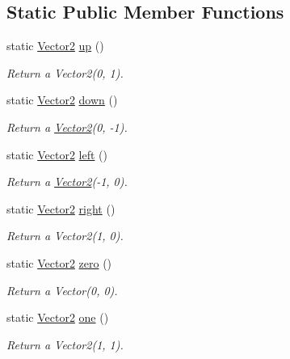\subsection*{Static Public Member Functions}
\begin{DoxyCompactItemize}
\item 
static \hyperlink{classfuzzy_telegram_1_1_vector2}{Vector2} \hyperlink{classfuzzy_telegram_1_1_vector2_aadd7753892849f0b2c153c5722994e09}{up} ()
\begin{DoxyCompactList}\small\item\em Return a Vector2(0, 1). \end{DoxyCompactList}\item 
static \hyperlink{classfuzzy_telegram_1_1_vector2}{Vector2} \hyperlink{classfuzzy_telegram_1_1_vector2_a322f8c638d03d93a9a2895bc17cf15e8}{down} ()
\begin{DoxyCompactList}\small\item\em Return a \hyperlink{classfuzzy_telegram_1_1_vector2}{Vector2}(0, -\/1). \end{DoxyCompactList}\item 
static \hyperlink{classfuzzy_telegram_1_1_vector2}{Vector2} \hyperlink{classfuzzy_telegram_1_1_vector2_a1e27ab02bba93378904944a97c14b63a}{left} ()
\begin{DoxyCompactList}\small\item\em Return a \hyperlink{classfuzzy_telegram_1_1_vector2}{Vector2}(-\/1, 0). \end{DoxyCompactList}\item 
static \hyperlink{classfuzzy_telegram_1_1_vector2}{Vector2} \hyperlink{classfuzzy_telegram_1_1_vector2_ac7cad3f58f45e55e2ff3f4c7519aa40e}{right} ()
\begin{DoxyCompactList}\small\item\em Return a Vector2(1, 0). \end{DoxyCompactList}\item 
static \hyperlink{classfuzzy_telegram_1_1_vector2}{Vector2} \hyperlink{classfuzzy_telegram_1_1_vector2_ac9a6d24cffa359d2c340394a9341946f}{zero} ()
\begin{DoxyCompactList}\small\item\em Return a Vector(0, 0). \end{DoxyCompactList}\item 
static \hyperlink{classfuzzy_telegram_1_1_vector2}{Vector2} \hyperlink{classfuzzy_telegram_1_1_vector2_a29ec891b5228e31b49d3e78f6ed3627c}{one} ()
\begin{DoxyCompactList}\small\item\em Return a Vector2(1, 1). \end{DoxyCompactList}\item 

\end{DoxyCompactItemize}
